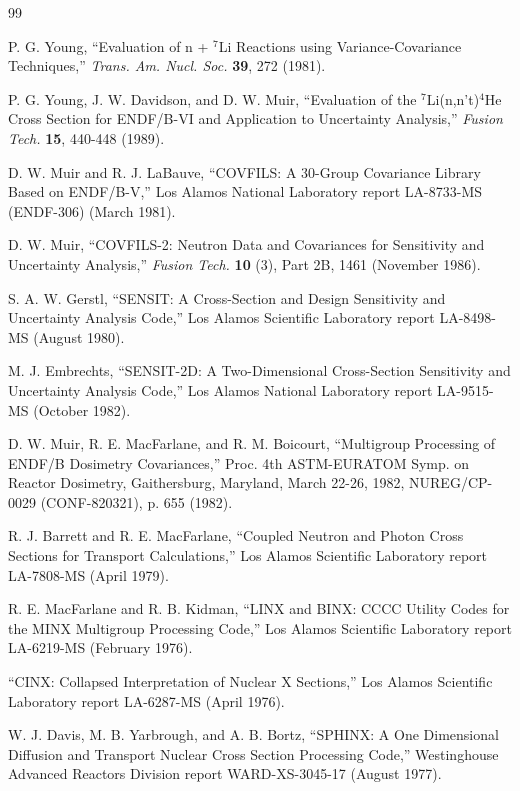 \documentclass[11pt,twoside]{NJOYMan}
\begin{document}
\begin{thebibliography}{99}
\begin{singlespace}
 P. G. Young, ``Evaluation of n + $^7$Li Reactions
  using Variance-Covariance Techniques,'' {\it Trans. Am. Nucl. Soc.}
  {\bf 39}, 272 (1981).

 P. G. Young, J. W. Davidson, and D. W. Muir,
  ``Evaluation of the $^7$Li(n,n't)$^4$He Cross Section for ENDF/B-VI and
  Application to Uncertainty Analysis,'' {\it Fusion Tech.} {\bf 15},
  440-448 (1989).

 D. W. Muir and R. J. LaBauve, ``COVFILS: A 30-Group
  Covariance Library Based on ENDF/B-V,'' Los Alamos National Laboratory
  report LA-8733-MS (ENDF-306)  (March 1981).

 D. W. Muir, ``COVFILS-2: Neutron Data and Covariances
  for Sensitivity and Uncertainty Analysis,'' {\it Fusion Tech.} {\bf 10}
  (3), Part 2B, 1461 (November 1986).

 S. A. W. Gerstl, ``SENSIT: A Cross-Section and Design
  Sensitivity and Uncertainty Analysis Code,'' Los Alamos Scientific
  Laboratory report LA-8498-MS (August 1980).

 M. J. Embrechts, ``SENSIT-2D: A Two-Dimensional
  Cross-Section Sensitivity and Uncertainty Analysis Code,'' Los Alamos
  National Laboratory report LA-9515-MS (October 1982).

 D. W. Muir, R. E. MacFarlane, and R. M. Boicourt,
  ``Multigroup Processing of ENDF/B Dosimetry Covariances,'' Proc. 4th
  ASTM-EURATOM Symp. on Reactor Dosimetry, Gaithersburg, Maryland, March
  22-26, 1982, NUREG/CP-0029 (CONF-820321), p. 655 (1982).

 R. J. Barrett and R. E. MacFarlane, ``Coupled
  Neutron and Photon Cross Sections for Transport Calculations,''
  Los Alamos Scientific Laboratory report LA-7808-MS (April 1979).

 R. E. MacFarlane and R. B. Kidman,
  ``LINX and BINX: CCCC Utility Codes for the MINX Multigroup
  Processing Code,'' Los Alamos Scientific Laboratory report
  LA-6219-MS (February 1976).

 ``CINX: Collapsed Interpretation of Nuclear
  X Sections,'' Los Alamos Scientific Laboratory
  report LA-6287-MS (April 1976).

 W. J. Davis, M. B. Yarbrough, and A. B. Bortz,
  ``SPHINX: A One Dimensional Diffusion and Transport Nuclear
  Cross Section Processing Code,'' Westinghouse Advanced Reactors
  Division report WARD-XS-3045-17 (August 1977).


\end{singlespace}
\end{thebibliography}
\end{document}
